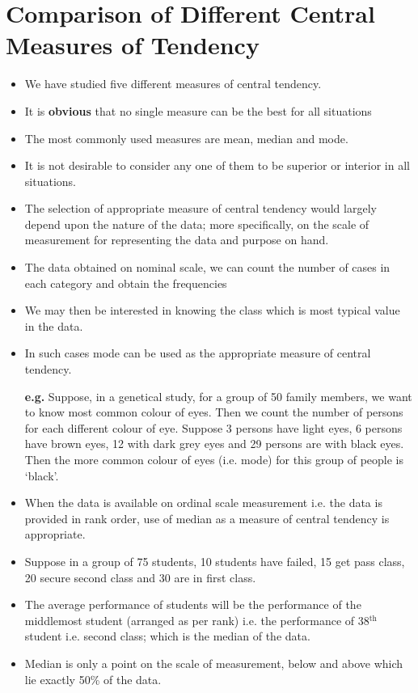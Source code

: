 \documentclass[
10pt, %
a4paper, %
]{report}
\begin{document}
\section{Comparison of Different Central Measures of Tendency}
\begin{itemize}
\item We have studied five different measures of central tendency.
\item It is \textbf{obvious} that no single measure can be the best for all situations
\item The most commonly used measures are mean, median and mode.
\item It is not desirable to consider any one of them to be superior or interior in all situations.
\item The selection of appropriate measure of central tendency would largely depend upon the nature of the data; more specifically, on the scale of measurement for representing the data and purpose on hand.
\item The data obtained on nominal scale, we can count the number of cases in each category and obtain the frequencies
\item We may then be interested in knowing the class which is most typical value in the data.
\item In such cases mode can be used as the appropriate measure of
central tendency.
\item[\textbf{e.g.}] Suppose, in a genetical study, for a group of 50 family members, we want to know most common colour of eyes. Then we count the number of persons for each different colour of eye. Suppose 3 persons have light eyes, 6 persons have brown eyes, 12 with dark grey eyes and 29 persons are with black eyes. Then the more common colour of eyes (i.e. mode) for this group of people is ‘black’.
\item When the data is available on ordinal scale measurement i.e. the data is provided in rank order, use of median as a measure of central tendency is appropriate.
\item Suppose in a group of 75 students, 10 students have failed, 15 get pass class, 20 secure second class and 30 are in first class.
\item The average performance of students will be the performance of the middlemost student (arranged as per rank) i.e. the performance of 38\(^\text{th}\) student i.e. second class; which is the median of the data.
\item Median is only a point on the scale of measurement, below and above which lie exactly 50\% of the data.

\end{itemize}
\end{document}
